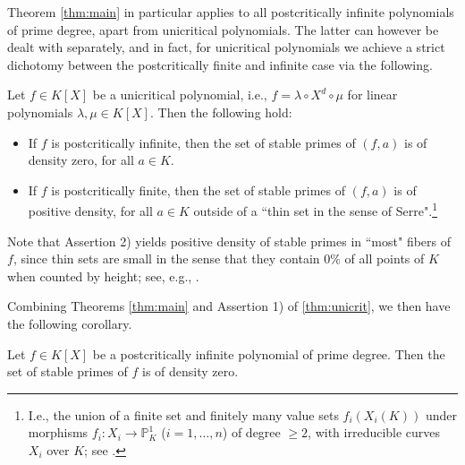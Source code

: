 \documentclass[a4paper]{amsart}
\begin{document}
Theorem \ref{thm:main} in particular applies to all postcritically infinite polynomials of prime degree, apart from unicritical polynomials. The latter can however be dealt with separately, and in fact, for unicritical polynomials we achieve a strict dichotomy between the postcritically finite and infinite case via the following.
\begin{theorem}
\label{thm:unicrit}
Let $f\in K[X]$ be a unicritical polynomial, i.e., $f=\lambda\circ X^d\circ \mu$ for linear polynomials $\lambda,\mu\in K[X]$. Then the following hold:
\begin{itemize}
\item[1)] If $f$ is postcritically infinite, then the set of stable primes of $(f,a)$ is of density zero, for all $a\in K$.
\item[2)] If $f$ is postcritically finite, then the set of stable primes of $(f,a)$ is of positive density, for all $a\in K$ outside of a ``thin set in the sense of Serre".\footnote{I.e., the union of a finite set and finitely many value sets $f_i(X_i(K))$ under morphisms $f_i: X_i\to \mathbb{P}^1_K$ ($i=1,\dots, n$) of degree $\ge 2$, with irreducible curves $X_i$ over $K$; see \cite[Definition 3.1.1]{Serre}.}
\end{itemize}
\end{theorem}
Note that Assertion 2) yields positive density of stable primes in ``most" fibers of $f$, since thin sets are small in the sense that they contain $0\%$ of all points of $K$ when counted by height; see, e.g., \cite[Proposition 3.4.2]{Serre}.


Combining Theorems \ref{thm:main} and Assertion 1) of \ref{thm:unicrit}, we then have the following corollary.
  \begin{corollary} %
  \label{thm:primedeg}
  Let $f\in K[X]$ be a postcritically infinite polynomial of prime degree. 
  Then the set of stable primes of $f$ is of density zero.
  \end{corollary}
  
\end{document}

